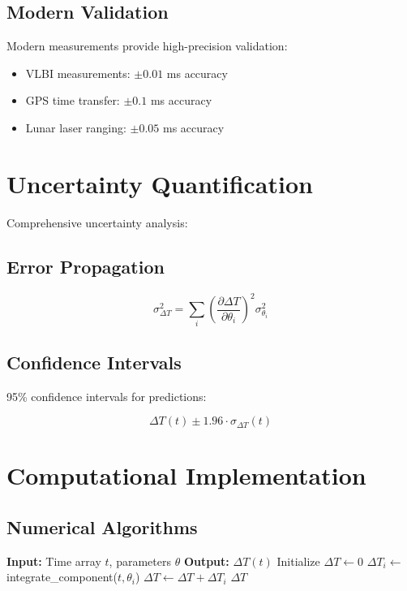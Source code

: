 \documentclass[12pt,a4paper]{report}
\begin{document}
\subsection{Modern Validation}

Modern measurements provide high-precision validation:

\begin{itemize}
\item VLBI measurements: $\pm 0.01$ ms accuracy
\item GPS time transfer: $\pm 0.1$ ms accuracy
\item Lunar laser ranging: $\pm 0.05$ ms accuracy
\end{itemize}

\section{Uncertainty Quantification}

Comprehensive uncertainty analysis:

\subsection{Error Propagation}

\[
\sigma_{\Delta T}^2 = \sum_{i} \left(\frac{\partial \Delta T}{\partial \theta_i}\right)^2 \sigma_{\theta_i}^2
\]

\subsection{Confidence Intervals}

95\% confidence intervals for predictions:

\[
\Delta T(t) \pm 1.96 \cdot \sigma_{\Delta T}(t)
\]

\section{Computational Implementation}

\subsection{Numerical Algorithms}

\begin{algorithm}[H]
\caption{DeltaT Component Integration}
\begin{algorithmic}[1]
\STATE \textbf{Input:} Time array $t$, parameters $\theta$
\STATE \textbf{Output:} $\Delta T(t)$
\STATE Initialize $\Delta T \leftarrow 0$
    \STATE $\Delta T_i \leftarrow$ integrate\_component($t, \theta_i$)
    \STATE $\Delta T \leftarrow \Delta T + \Delta T_i$
\ENDFOR
\RETURN $\Delta T$
\end{algorithmic}
\end{algorithm}
\end{document}
